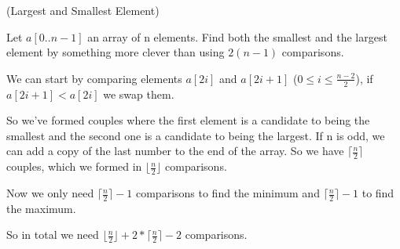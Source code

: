 \documentclass[10pt,a4paper,oneside]{article}
\newenvironment{exercice}[1][Exercice]{\begin{trivlist}
\item[\hskip \labelsep {\bfseries #1}]}{\end{trivlist}}
\newenvironment{solution}[1][Solution]{\begin{trivlist}
\item[\hskip \labelsep {\bfseries #1}]}{\end{trivlist}}
\begin{document}
\begin{exercice} (Largest and Smallest Element)

Let $a[0..n-1]$ an array of n elements. Find both the smallest and the largest element by something more clever than using $2(n - 1)$ comparisons.

\end{exercice}

\begin{solution}
We can start by comparing elements $a[2i]$ and $a[2i + 1]$ ($0 \leq i \leq \frac{n - 2}{2}$), if $a[2i + 1] < a[2i]$ we swap them.

So we've formed couples where the first element is a candidate to being the smallest and the second one is a candidate to being the largest. If n is odd, we can add a copy of the last number to the end of the array. So we have $\lceil \frac{n}{2} \rceil$ couples, which we formed in $\lfloor \frac{n}{2} \rfloor$ comparisons.

Now we only need $\lceil \frac{n}{2} \rceil - 1$ comparisons to find the minimum and $\lceil \frac{n}{2} \rceil - 1$ to find the maximum.

So in total we need $\lfloor \frac{n}{2} \rfloor + 2 * \lceil \frac{n}{2} \rceil - 2$ comparisons.

\end{solution}
\end{document}
